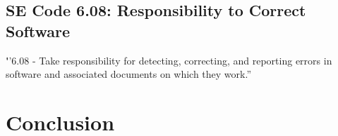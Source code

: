 \documentclass[11pt]{article}
\begin{document}
\begin{multicols}{2}
\subsection{SE Code 6.08: Responsibility to Correct Software}

{\addtolength{\leftskip}{6mm}
{\textbf''6.08 - Take responsibility for detecting, correcting, and reporting errors in software and associated documents on which they work.''}
}


\section{Conclusion}

\end{multicols}
\newpage


\nocite{*}




\end{document}

